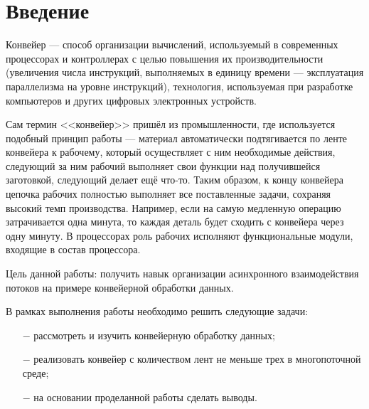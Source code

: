 \chapter*{Введение}

Конвейер — способ организации вычислений, используемый в современных процессорах и контроллерах с целью повышения их производительности (увеличения числа инструкций, выполняемых в единицу времени — эксплуатация параллелизма на уровне инструкций), технология, используемая при разработке компьютеров и других цифровых электронных устройств.

Сам термин <<конвейер>> пришёл из промышленности, где используется подобный принцип работы — материал автоматически подтягивается по ленте конвейера к рабочему, который осуществляет с ним необходимые действия, следующий за ним рабочий выполняет свои функции над получившейся заготовкой, следующий делает ещё что-то. Таким образом, к концу конвейера цепочка рабочих полностью выполняет все поставленные задачи, сохраняя высокий темп производства. Например, если на самую медленную операцию затрачивается одна минута, то каждая деталь будет сходить с конвейера через одну минуту. В процессорах роль рабочих исполняют функциональные модули, входящие в состав процессора.

Цель данной работы: получить навык организации асинхронного взаимодействия потоков на примере конвейерной обработки данных.

В рамках выполнения работы необходимо решить следующие задачи:
\begin{itemize}
	\item[$-$] рассмотреть и изучить конвейерную обработку данных;
	\item[$-$] реализовать конвейер с количеством лент не меньше трех в многопоточной среде;
	\item[$-$] на основании проделанной работы сделать выводы.
\end{itemize}
